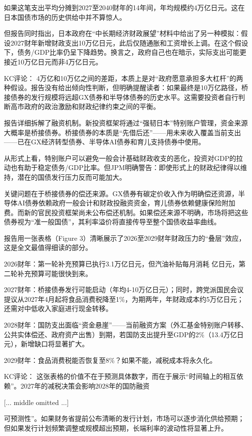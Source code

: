 \documentclass[11pt]{ctexart}
\begin{document}
如果这笔支出平均分摊到2027至2040财年的14年间，年均规模约4万亿日元。这在日本国债市场的历史供给中并不算惊人。

但报告同时指出，日本政府在“中长期经济财政展望”材料中给出了另一种模拟：假设2027财年新增财政支出10万亿日元，此后仅随通胀和工资增长上调。在这个假设下，债务/GDP比率仍呈下降趋势。换言之，政府自己也在暗示，实际支出可能更接近10万亿日元而非4万亿日元。

KC评论： 4万亿和10万亿之间的差距，本质上是对“政府愿意承担多大杠杆”的两种假设。报告没有给出倾向性判断，但明确提醒读者：如果最终是10万亿路径，桥接债券的发行规模将远超GX债券和半导体债券的历史水平。这需要投资者自行判断高市政府的政治激励和财政纪律约束之间的平衡。

报告详细拆解了融资机制。新投资框架将通过“强韧日本”特别账户管理，资金来源大概率是桥接债券。桥接债券的本质是“先借后还”——用未来收入覆盖当前支出——已在GX经济转型债券、半导体AI债券和育儿支持债券中使用。

从形式上看，特别账户可以避免一般会计基础财政收支的恶化，投资对GDP的拉动也有助于稳定债务/GDP比率。但JPM明确警告：即使形式上的财政纪律得以维持，潜在的国债发行压力反而可能加大。

关键问题在于桥接债券的偿还来源。GX债券有碳定价收入作为明确偿还资源，半导体AI债券依赖政府一般会计和财政投融资资金，育儿债券依赖健康保险附加费。而新的官民投资框架尚未公布偿还机制。如果偿还来源不明确，市场将把这些债券视为“准一般国债”，其利率溢价将直接传导至整个国债收益率曲线。

报告用一张表格（Figure 3）清晰展示了2026至2029财年财政压力的“叠层”效应，这是全文最值得细读的部分。

2026财年：第一轮补充预算已执行3.1万亿日元，但汽油补贴每月消耗 亿日元，第二轮补充预算可能很快到来。

2027财年：桥接债券发行可能启动（年均4-10万亿日元）；同时，跨党派国民会议提议从2027年4月起将食品消费税降至1\%，为期两年，年财政成本约5万亿日元；还需对中低收入家庭进行现金转移。

2028财年：国防支出面临“资金悬崖”——当前融资方案（外汇基金特别账户转移、公共实体偿还、政府资产出售）到期，若国防支出提升至GDP的2\%（13.4万亿日元），新增缺口将显著扩大。

2029财年：食品消费税能否恢复至8\%？如果不能，减税成本将永久化。

KC评论： 这张表格的价值不在于预测具体数字，而在于展示“时间轴上的相互依赖”。2027年的减税决策会影响2028年的国防融资

[... middle omitted ...]

可预测性”。如果财务省提前公布清晰的发行计划，市场可以逐步消化供给预期；但如果发行计划频繁调整或规模超出预期，长端利率的波动性将显著上升。
\end{document}
